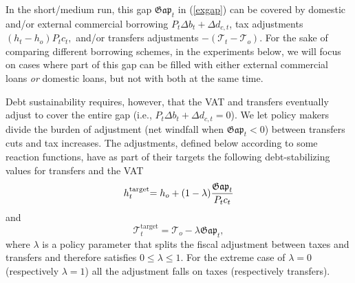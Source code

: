 \documentclass[11pt]{article}
\begin{document}
In the short/medium run, this gap $\mathfrak{Gap}_{t}$ in (\ref{exgap}) can
be covered by domestic and/or external commercial borrowing $P_{t}\Delta
b_{t}+\Delta d_{c,t}$, tax adjustments $(h_{t}-h_{o})P_{t}c_{t},$ and/or
transfers adjustments $-(\mathcal{T}_{t}-\mathcal{T}_{o}).$ For the sake of
comparing different borrowing schemes, in the experiments below, we will
focus on cases where part of this gap can be filled with either external
commercial loans \textit{or} domestic loans, but not with both at the same
time.

Debt sustainability requires, however, that the VAT and transfers eventually
adjust to cover the entire gap (i.e., $P_{t}\Delta b_{t}+\Delta d_{c,t}=0$).
We let policy makers divide the burden of adjustment (net windfall when $%
\mathfrak{Gap}_{t}<0$) between transfers cuts and tax increases. The
adjustments, defined below according to some reaction functions, have as
part of their targets the following debt-stabilizing values for transfers
and the VAT 
\begin{equation}
{\small h}_{t}^{\text{target}}{\small =h}_{o}+(1-\lambda )\frac{\mathfrak{Gap%
}_{t}}{P_{t}c_{t}}  \label{h_target}
\end{equation}%
and%
\begin{equation}
\mathcal{T}_{t}^{\text{target}}=\mathcal{T}_{o}-\lambda \mathfrak{Gap}_{t},
\label{T_target}
\end{equation}%
where $\lambda $ is a policy parameter that splits the fiscal adjustment
between taxes and transfers and therefore satisfies $0\leq \lambda \leq 1.$
For the extreme case of $\lambda =0$ (respectively $\lambda =1$) all the
adjustment falls on taxes (respectively transfers).
\end{document}
